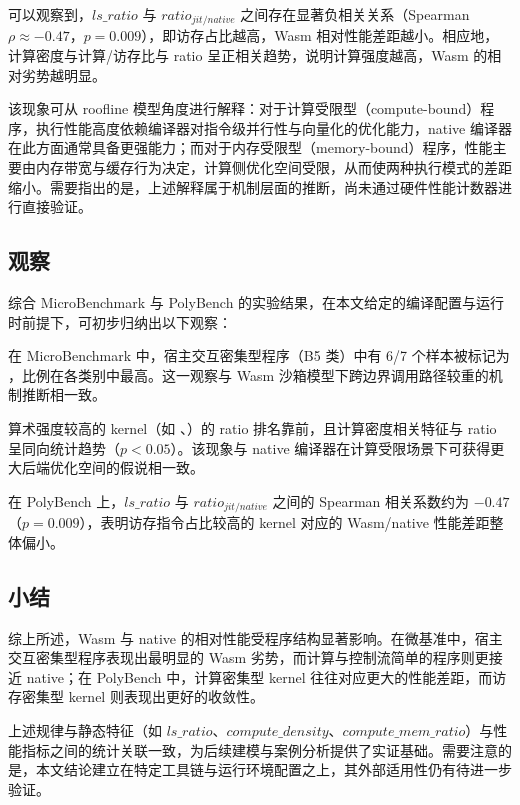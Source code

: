 可以观察到，$ls\_ratio$ 与 $ratio_{jit/native}$ 之间存在显著负相关关系（Spearman $\rho \approx -0.47$，$p = 0.009$），即访存占比越高，Wasm 相对性能差距越小。相应地，计算密度与计算/访存比与 ratio 呈正相关趋势，说明计算强度越高，Wasm 的相对劣势越明显。

该现象可从 roofline 模型角度进行解释：对于计算受限型（compute-bound）程序，执行性能高度依赖编译器对指令级并行性与向量化的优化能力，native 编译器在此方面通常具备更强能力；而对于内存受限型（memory-bound）程序，性能主要由内存带宽与缓存行为决定，计算侧优化空间受限，从而使两种执行模式的差距缩小。需要指出的是，上述解释属于机制层面的推断，尚未通过硬件性能计数器进行直接验证。

\subsection{观察}

综合 MicroBenchmark 与 PolyBench 的实验结果，在本文给定的编译配置与运行时前提下，可初步归纳出以下观察：

在 MicroBenchmark 中，宿主交互密集型程序（B5 类）中有 6/7 个样本被标记为 ，比例在各类别中最高。这一观察与 Wasm 沙箱模型下跨边界调用路径较重的机制推断相一致。

算术强度较高的 kernel（如 、）的 ratio 排名靠前，且计算密度相关特征与 ratio 呈同向统计趋势（$p < 0.05$）。该现象与 native 编译器在计算受限场景下可获得更大后端优化空间的假说相一致。

在 PolyBench 上，$ls\_ratio$ 与 $ratio_{jit/native}$ 之间的 Spearman 相关系数约为 $-0.47$（$p = 0.009$），表明访存指令占比较高的 kernel 对应的 Wasm/native 性能差距整体偏小。


\subsection{小结}

综上所述，Wasm 与 native 的相对性能受程序结构显著影响。在微基准中，宿主交互密集型程序表现出最明显的 Wasm 劣势，而计算与控制流简单的程序则更接近 native；在 PolyBench 中，计算密集型 kernel 往往对应更大的性能差距，而访存密集型 kernel 则表现出更好的收敛性。

上述规律与静态特征（如 $ls\_ratio$、$compute\_density$、$compute\_mem\_ratio$）与性能指标之间的统计关联一致，为后续建模与案例分析提供了实证基础。需要注意的是，本文结论建立在特定工具链与运行环境配置之上，其外部适用性仍有待进一步验证。